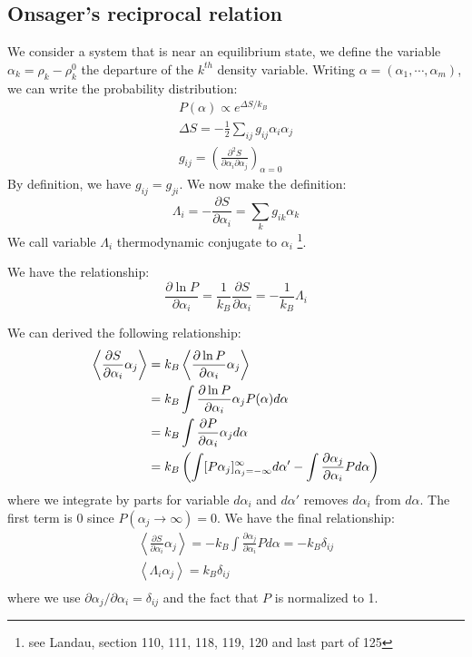 \documentclass{article}
\newcommand{\pfrac}[2]{\frac{\partial #1}{\partial #2}}
\begin{document}
\subsection{Onsager's reciprocal relation}
We consider a system that is near an equilibrium state, we define the 
variable $\alpha_k = \rho_k - \rho_k^0$ the departure of the $k^{th}$ density
variable. Writing $\alpha = (\alpha_1, \cdots, \alpha_m)$, we can write 
the probability distribution:
\begin{gather}
    P(\alpha) \propto e^{\Delta S/k_B} \\
    \Delta S = -\frac{1}{2} \sum_{ij} g_{ij} \alpha_i \alpha_j \\
    g_{ij} = \left( \frac{\partial^2S}{\partial \alpha_i \partial \alpha_j} \right)_{\alpha=0}
\end{gather}
By definition, we have $g_{ij} = g_{ji}$. We now make the definition:
\begin{equation}
    \Lambda_i = - \pfrac{S}{\alpha_i} = \sum_k g_{ik} \alpha_k \label{conjugate_alpha}
\end{equation}
We call variable $\Lambda_i$ thermodynamic conjugate to $\alpha_i$
\footnote{see Landau, section 110, 111, 118, 119, 120 and last part of 125}. 

We have the relationship:
\begin{equation}
    \pfrac{\ln P}{\alpha_i} = \frac{1}{k_B} \frac{\partial S}{\partial \alpha_i} 
    = - \frac{1}{k_B} \Lambda_i \label{tmp}
\end{equation}

We can derived the following relationship:
\begin{align}
    \left\langle \pfrac{S}{\alpha_i} \alpha_j \right\rangle 
    &= k_B \left\langle \pfrac{\ln P}{\alpha_i} \alpha_j \right\rangle \notag \\
    &= k_B \int \pfrac{\ln P}{\alpha_i} \alpha_j P(\alpha) d\alpha \notag \\
    &= k_B \int \pfrac{P}{\alpha_i} \alpha_j  d\alpha \notag \\
    &= k_B \left( \int [P\alpha_j]_{\alpha_j = -\infty}^{\infty}  d\alpha' - \int \pfrac{\alpha_j}{\alpha_i} P d\alpha \right)\notag \\
\end{align}
where we integrate by parts for variable $d\alpha_i$ and $d\alpha'$ removes $d\alpha_i$ from $d\alpha$. The 
first term is 0 since $P(\alpha_j \to \infty) = 0$. We have the final relationship:
\begin{gather}
    \left\langle \pfrac{S}{\alpha_i} \alpha_j \right\rangle  = - k_B \int \pfrac{\alpha_j}{\alpha_i} P d\alpha = -k_B \delta_{ij} \\
    \left\langle \Lambda_i \alpha_j \right\rangle = k_B \delta_{ij} \label{derive} \\
\end{gather}
where we use $\partial \alpha_j / \partial \alpha_i = \delta_{ij}$ and the fact that $P$ is normalized to 1.
\end{document}
